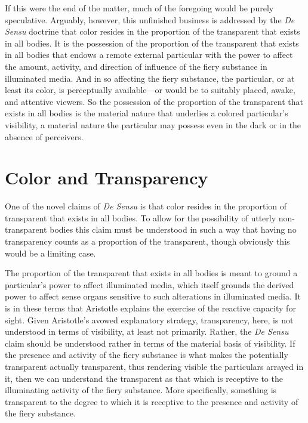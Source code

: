 If this were the end of the matter, much of the foregoing would be purely speculative. Arguably, however, this unfinished business is addressed by the \emph{De Sensu} doctrine that color resides in the proportion of the transparent that exists in all bodies. It is the possession of the proportion of the transparent that exists in all bodies that endows a remote external particular with the power to affect the amount, activity, and direction of influence of the fiery substance in illuminated media. And in so affecting the fiery substance, the particular, or at least its color, is perceptually available---or would be to suitably placed, awake, and attentive viewers. So the possession of the proportion of the transparent that exists in all bodies is the material nature that underlies a colored particular's visibility, a material nature the particular may possess even in the dark or in the absence of perceivers.


\section{Color and Transparency} %
\label{sec:color_and_transparency}

One of the novel claims of \emph{De Sensu} is that color resides in the proportion of transparent that exists in all bodies. To allow for the possibility of utterly non-transparent bodies this claim must be understood in such a way that having no transparency counts as a proportion of the transparent, though obviously this would be a limiting case. 

The proportion of the transparent that exists in all bodies is meant to ground a particular's power to affect illuminated media, which itself grounds the derived power to affect sense organs sensitive to such alterations in illuminated media. It is in these terms that Aristotle explains the exercise of the reactive capacity for sight. Given Aristotle's avowed explanatory strategy, transparency, here, is not understood in terms of visibility, at least not primarily. Rather, the \emph{De Sensu} claim should be understood rather in terms of the material basis of visibility. If the presence and activity of the fiery substance is what makes the potentially transparent actually transparent, thus rendering visible the particulars arrayed in it, then we can understand the transparent as that which is receptive to the illuminating activity of the fiery substance. More specifically, something is transparent to the degree to which it is receptive to the presence and activity of the fiery substance. 

